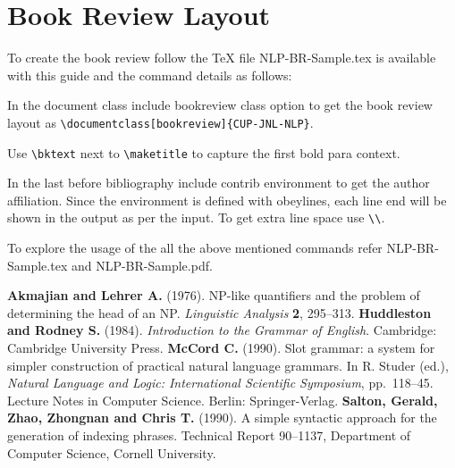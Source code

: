 \documentclass{CUP-JNL-NLP}
\begin{document}
\section{Book Review Layout}

To create the book review follow the TeX file NLP-BR-Sample.tex is available with this guide and the command details as follows:

In the document class include bookreview class option to get the book review layout as \verb"\documentclass[bookreview]{CUP-JNL-NLP}".

Use \verb"\bktext" next to \verb"\maketitle" to capture the first bold para context.

In the last before bibliography include contrib environment to get the author affiliation. Since the environment is defined with obeylines, each line end will be shown in the output as per the input. To get extra line space use \verb"\\".

To explore the usage of the all the above mentioned commands refer NLP-BR-Sample.tex and NLP-BR-Sample.pdf.

\begin{thebibliography}{}
   \textbf{Akmajian and Lehrer A.} (1976). NP-like quantifiers and the
   problem of determining the head of an NP. {\it Linguistic
   Analysis\/} \textbf{2}, 295--313.
   \textbf{Huddleston and Rodney S.} (1984). {\it Introduction to the Grammar of
   English}. Cambridge: Cambridge University Press.
   \textbf{McCord C.} (1990). Slot grammar: a system for simpler
   construction of practical natural language grammars. In R.
   Studer (ed.), {\it Natural Language and Logic: International
   Scientific Symposium}, pp.~118--45. Lecture Notes in Computer
   Science. Berlin: Springer-Verlag.
   \textbf{Salton, Gerald, Zhao, Zhongnan and Chris T.} (1990).
   A simple syntactic approach for the generation of indexing
   phrases. Technical Report 90--1137, Department of Computer
   Science, Cornell University.
\end{thebibliography}



%
%

\label{lastpage}
\end{document}
